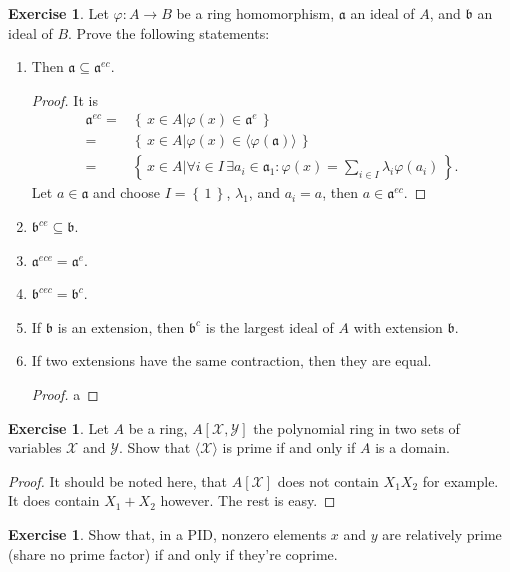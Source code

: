 \documentclass{book}
\theoremstyle{plain}
\theoremstyle{definition}
\newtheorem{exr}[thm]{Exercise}
\theoremstyle{custom_definition}
\newcommand{\set}[1]{\left\{\, #1 \,\right\}}
\newcommand{\makeset}[2]{\left\{\, #1 \mathrel{\Big|} #2 \,\right\}}
\begin{document}
\begin{exr}
  Let \(\varphi: A \longrightarrow B\) be a ring homomorphism, \(\mathfrak{a}\) an ideal of \(A\), and \(\mathfrak{b}\) an ideal of \(B\). Prove the following statements:
  \begin{enumerate}
    \item Then \(\mathfrak{a} \subseteq \mathfrak{a}^{ec}\).
    \begin{proof}
      It is
      \begin{align}
        \mathfrak{a}^{ec} = & \makeset{x \in A}{\varphi(x) \in \mathfrak{a}^e} \\
        = & \makeset{x \in A}{\varphi(x) \in \langle \varphi(\mathfrak{a}) \rangle} \\
        = & \makeset{x \in A}{\forall i \in I \, \exists a_i \in \mathfrak{a}_1 : \varphi(x) = \sum_{i \in I} \lambda_i \varphi(a_i)} \text{.}
      \end{align}
      Let \(a \in \mathfrak{a}\) and choose \(I = \set{1}\), \(\lambda_1\), and \(a_i = a\), then \(a \in \mathfrak{a}^{ec}\).
    \end{proof}
    \item \(\mathfrak{b}^{ce} \subseteq \mathfrak{b}\).
    \item \(\mathfrak{a}^{ece} = \mathfrak{a}^e\).
    \item \(\mathfrak{b}^{cec} = \mathfrak{b}^c\).
    \item If \(\mathfrak{b}\) is an extension, then \(\mathfrak{b}^c\) is the largest ideal of \(A\) with extension \(\mathfrak{b}\).
    \item If two extensions have the same contraction, then they are equal.
    \begin{proof}
      a
    \end{proof}
  \end{enumerate}
\end{exr}

\begin{exr}
  Let \(A\) be a ring, \(A[\mathcal{X}, \mathcal{Y}]\) the polynomial ring in two sets of variables \(\mathcal{X}\) and \(\mathcal{Y}\). Show that \(\langle \mathcal{X} \rangle\) is prime if and only if \(A\) is a domain.
\end{exr}
\begin{proof}
  It should be noted here, that \(A[\mathcal{X}]\) does not contain \(X_1 X_2\) for example. It does contain \(X_1 + X_2\) however. The rest is easy.
\end{proof}
\begin{exr}
  Show that, in a PID, nonzero elements \(x\) and \(y\) are relatively prime (share no prime factor) if and only if they're coprime.
\end{exr}
\end{document}
